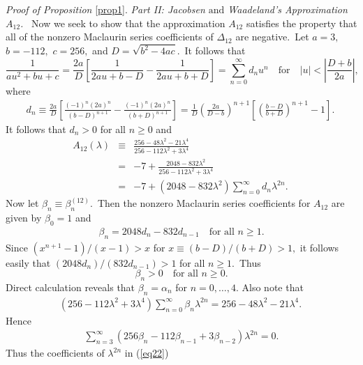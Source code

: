 \documentclass[final,oneeqnum]{siamltex}
\begin{document}
{\it Proof of Proposition} \ref{prop1}.
{\em Part {\rm II:}  Jacobsen $\mbox{and}$ Waadeland's  Approximation
$A_{12}$.} \  Now
we seek to show that the approximation
$A_{12}$ satisfies the property that all of the nonzero Maclaurin series
coefficients of
$\Delta_{12}$ are negative.\  Let $a=3,$ $b=-112,$ $c=256,$ and
$D=\sqrt{b^2-4ac}$.\ It follows that
\[
\frac{1}{au^2 + bu + c}=\frac{2a}{D}\left[\frac{1}{2au + b-D} -\frac{1}{2au
+ b+D}\right] = \sum_{n=0}^{\infty}d_{n}u^n
\quad \mbox{for}  \quad |u| < \left|\frac{D+b}{2a}\right|,
\]  
where
\begin{eqnarray}
d_{n}\equiv
\frac{2a}{D}\left[\frac{(-1)^n(2a)^n}{(b-D)^{n+1}}-\frac{(-1)^n(2a)^n}
{(b+D)^{n+1}}\right]=
 \frac{1}{D}\left(\frac{2a}{D-b}\right)^{n+1}\left[\left(\frac{b-D}{b+D}\right)^
{n+1}-1\right].\ \nonumber
\end{eqnarray} 
It follows that $d_{n} >0$ for all $n\geq 0$ and
\begin{eqnarray} 
A_{12}(\lambda) &\equiv& \frac{256-48\lambda^2
-21\lambda^4}{256-112\lambda^2 +3\lambda^4}\nonumber\\ &=&-7
+\frac{2048 - 832\lambda^2}{256-112\lambda^2 +3\lambda^4}  \nonumber \\ &=&
-7 +(2048 - 832\lambda^2)
\sum_{n=0}^{\infty}d_{n}\lambda^{2n}.\  \nonumber
\end{eqnarray} 
Now let $\beta_{n} \equiv \beta^{(12)}_{n}$.\ Then the nonzero
Maclaurin series
coefficients for $A_{12}$ are given by
$\beta_{0} = 1$ and
\begin{eqnarray}
\beta_{n} = 2048d_{n} - 832d_{n-1} \quad \mbox{for all  $n\geq 1$.}  \nonumber
\end{eqnarray}
Since $(x^{n+1}-1)/(x-1) > x$ for
$x\equiv (b-D)/(b+D)> 1,$ it follows easily that
$(2048d_{n})/(832d_{n-1})>1$
for all $n\geq 1$.\ Thus
\begin{equation}
\beta_{n} >0
\quad \mbox{for all  $n\geq 0$.} \label{eq21}
\end{equation}
Direct calculation reveals that $\beta_{n} = \alpha_{n}$ for $n=0,\ldots,4$.
Also note that
\begin{eqnarray} 
(256 - 112\lambda^2 + 3\lambda^4)
\sum_{n=0}^{\infty}\beta_{n}\lambda^{2n}
= 256 - 48\lambda^2
-21\lambda^4.\  \nonumber
\end{eqnarray} 
Hence
\begin{eqnarray}
\sum_{n=3}^{\infty}(256\beta_{n} - 112\beta_{n-1} +
3\beta_{n-2})\lambda^{2n} = 0.\label{eq22}
\end{eqnarray} 
Thus the coefficients of $\lambda^{2n}$ in (\ref{eq22})
\end{document}
